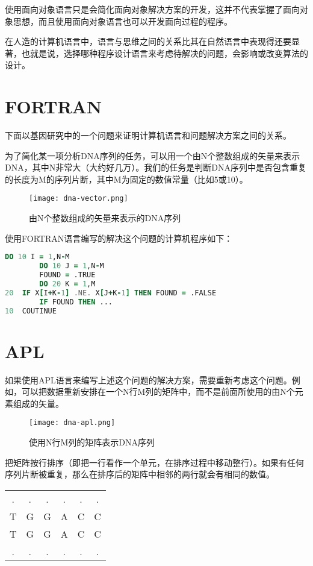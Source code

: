 使用面向对象语言只是会简化面向对象解决方案的开发，这并不代表掌握了面向对象思想，而且使用面向对象语言也可以开发面向过程的程序。


在人造的计算机语言中，语言与思维之间的关系比其在自然语言中表现得还要显著，也就是说，选择哪种程序设计语言来考虑待解决的问题，会影响或改变算法的设计。

\section{FORTRAN}


下面以基因研究中的一个问题来证明计算机语言和问题解决方案之间的关系。

为了简化某一项分析DNA序列的任务，可以用一个由N个整数组成的矢量来表示DNA，其中N非常大（大约好几万）。我们的任务是判断DNA序列中是否包含重复的长度为M的序列片断，其中M为固定的数值常量（比如5或10）。


\begin{figure}[htbp]
\centering
\texttt{[image: dna-vector.png]}
\caption{由N个整数组成的矢量来表示的DNA序列}
\label{fig:dna-vector}
\end{figure}

使用FORTRAN语言编写的解决这个问题的计算机程序如下：

\begin{lstlisting}[language=Fortran]
		DO 10 I = 1,N-M
		DO 10 J = 1,N-M
		FOUND = .TRUE
		DO 20 K = 1,M
20	IF X[I+K-1] .NE. X[J+K-1] THEN FOUND = .FALSE
		IF FOUND THEN ...
10	COUTINUE
\end{lstlisting}

\section{APL}


如果使用APL语言来编写上述这个问题的解决方案，需要重新考虑这个问题。例如，可以把数据重新安排在一个N行M列的矩阵中，而不是前面所使用的由N个元素组成的矢量。

\begin{figure}[htbp]
\centering
\texttt{[image: dna-apl.png]}
\caption{使用N行M列的矩阵表示DNA序列}
\label{fig:dna-apl}
\end{figure}

把矩阵按行排序（即把一行看作一个单元，在排序过程中移动整行）。如果有任何序列片断被重复，那么在排序后的矩阵中相邻的两行就会有相同的数值。

\begin{table}[htb]
\centering
\begin{tabular}{cccccc}
.&	.&	.&.	&.	&.	\\
T	&G	&G	&A	&C	&C\\
T	&G	&G	&A	&C	&C\\
.&	.&.	&.	&.	&.	\\
\end{tabular}
\end{table}


